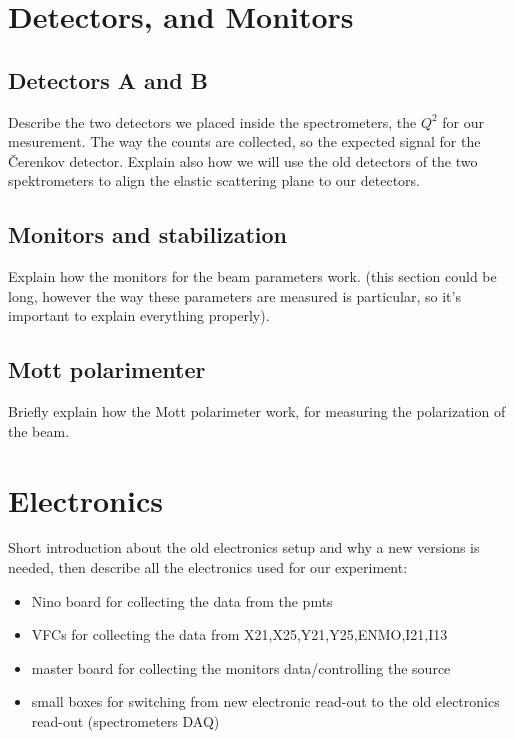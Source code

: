 \section{Detectors, and Monitors}

\subsection{Detectors A and B}
Describe the two detectors we placed inside the spectrometers, the $Q^{2}$ for our mesurement. The way the counts are collected, so the expected signal for the Čerenkov detector. Explain also how we will use the old detectors of the two spektrometers to align the elastic scattering plane to our detectors.

\subsection{Monitors and stabilization}
Explain how the monitors for the beam parameters work. (this section could be long, however the way these parameters are measured is particular, so it's important to explain everything properly).

\subsection{Mott polarimenter}
Briefly explain how the Mott polarimeter work, for measuring the polarization of the beam.

\section{Electronics}
Short introduction about the old electronics setup and why a new versions is needed, then describe all the electronics used for our experiment:
\begin{itemize}
\item Nino board for collecting the data from the pmts
\item VFCs for collecting the data from X21,X25,Y21,Y25,ENMO,I21,I13
\item master board for collecting the monitors data/controlling the source
\item small boxes for switching from new electronic read-out to the old electronics read-out (spectrometers DAQ)
\end{itemize}

